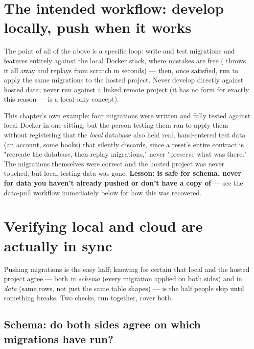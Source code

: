 \section{The intended workflow: develop locally, push when it works}
\label{sec:workflow}

The point of all of the above is a specific loop: write and test migrations and features entirely against the local Docker stack, where mistakes are free ( throws it all away and replays from scratch in seconds) — then, once satisfied, run  to apply the same migrations to the hosted project. Never develop directly against hosted data; never run  against a linked remote project (it has no  form for exactly this reason —  is a local-only concept).

\begin{olkgotcha}
This chapter's own example: four migrations were written and fully tested against local Docker in one sitting, but the person testing them ran  to apply them — without registering that the \emph{local} database also held real, hand-entered test data (an account, some books) that  silently discards, since a reset's entire contract is "recreate the database, then replay migrations," never "preserve what was there." The migrations themselves were correct and the hosted project was never touched, but local testing data was gone. \textbf{Lesson:  is safe for schema, never for data you haven't already pushed or don't have a copy of} — see the data-pull workflow immediately below for how this was recovered.
\end{olkgotcha}

\section{Verifying local and cloud are actually in sync}

Pushing migrations is the easy half; knowing for certain that local and the hosted project agree — both in \emph{schema} (every migration applied on both sides) and in \emph{data} (same rows, not just the same table shapes) — is the half people skip until something breaks. Two checks, run together, cover both.

\subsection{Schema: do both sides agree on which migrations have run?}

